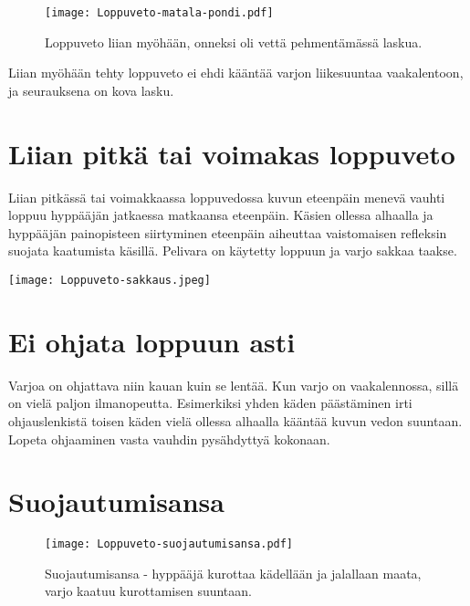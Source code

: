 \begin{figure*}[]\centering\texttt{[image: Loppuveto-matala-pondi.pdf]}\caption{Loppuveto liian myöhään, onneksi oli vettä pehmentämässä laskua.}\end{figure*}   


Liian myöhään tehty loppuveto ei ehdi kääntää varjon liikesuuntaa vaakalentoon, ja seurauksena on kova lasku. 

\section{ Liian pitkä tai voimakas loppuveto }
\label{laskeutumisvirheet-liian-pitka-tai-voimakas-loppuveto}


Liian pitkässä tai voimakkaassa loppuvedossa kuvun eteenpäin menevä vauhti loppuu hyppääjän jatkaessa matkaansa eteenpäin. Käsien ollessa alhaalla ja hyppääjän painopisteen siirtyminen eteenpäin aiheuttaa vaistomaisen refleksin suojata kaatumista käsillä. Pelivara on käytetty loppuun ja varjo sakkaa taakse. 


\begin{Figure}\centering\texttt{[image: Loppuveto-sakkaus.jpeg]}\end{Figure}  

\section{ Ei ohjata loppuun asti }
\label{laskeutumisvirheet-ei-ohjata-loppuun-asti}


Varjoa on ohjattava niin kauan kuin se lentää. Kun varjo on vaakalennossa, sillä on vielä paljon ilmanopeutta. Esimerkiksi yhden käden päästäminen irti ohjauslenkistä toisen käden vielä ollessa alhaalla kääntää kuvun vedon suuntaan. Lopeta ohjaaminen vasta vauhdin pysähdyttyä kokonaan. 

\section{ Suojautumisansa }
\label{laskeutumisvirheet-suojautumisansa}


\begin{figure*}[]\centering\texttt{[image: Loppuveto-suojautumisansa.pdf]}\caption{Suojautumisansa - hyppääjä kurottaa kädellään ja jalallaan maata, varjo kaatuu kurottamisen suuntaan.}\end{figure*} 


